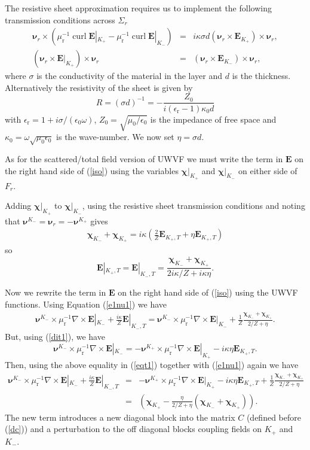 \documentclass[a4paper,12pt]{article}
\newcommand{\bfE}{\mathbf{E}}
\newcommand{\bfnu}{\boldsymbol{\nu}}
\newcommand{\bfchi}{\boldsymbol{\chi}}
\DeclareMathOperator{\curl}{curl}
\newcommand{\epsr}{\epsilon_{\mathrm{r}}}
\newcommand{\mur}{\mu_{\mathrm{r}}}
\begin{document}
The resistive sheet approximation requires us to implement the following transmission conditions across $\Sigma_r$
\begin{eqnarray}
\bfnu_r\times(\mur^{-1}\curl\bfE|_{K_+}-\mur^{-1}\curl\bfE|_{K_-}) &=&i\kappa\sigma d (\bfnu_r\times \bfE_{K_+})\times \bfnu_r,\label{dit1}\\
(\bfnu_r\times \bfE|_{K_+})\times \bfnu_r&=&(\bfnu_r\times \bfE_{K_-})\times \bfnu_r,\label{dit2}
\end{eqnarray}
where $\sigma$ is the conductivity of the material in the layer and $d$ is the thickness.  Alternatively the resistivity of the sheet is given by
\[
R=(\sigma d)^{-1}=-\frac{Z_0}{i(\epsr-1)\kappa_0d}
\]
with $\epsr=1+i\sigma /(\epsilon_0\omega)$, $Z_0=\sqrt{\mu_0/\epsilon_0}$ is the impedance of free space  and $\kappa_0=\omega\sqrt{\mu_0\epsilon_0}$ is the wave-number. We now set  $\eta=\sigma d$. 

As for the scattered/total field version of UWVF we must write the term in $\bfE$ on the right hand side of (\ref{iso})
using the variables $\bfchi|_{K_+}$ and $\bfchi|_{K_-}$ on either side of $F_r$.

Adding $\bfchi|_{K_+}$ to $\bfchi|_{K_-}$, using the resistive sheet transmission conditions and noting that $\bfnu^{K_-}=\bfnu_r=-\bfnu^{K_+}$ gives
\begin{eqnarray*}
\bfchi_{K_-}+\bfchi_{K_+}
=i\kappa\left(\frac{2}{Z}\bfE_{K_+,T} + \eta \bfE_{K_+,T}\right)
\end{eqnarray*}
so
\begin{equation}
\bfE|_{K_+,T}=\bfE|_{K_-,T}=\frac{\bfchi_{K_-}+\bfchi_{K_+}}{2i\kappa/Z+i\kappa\eta }.
\label{e1nu1}
\end{equation}

Now we rewrite the term in $\bfE$ on the right hand side of (\ref{iso}) using the UWVF functions. Using Equation (\ref{e1nu1}) we have
  \begin{eqnarray}
\bfnu^{K_-}\times\mur^{-1}\nabla\times\bfE|_{K_-}+\frac{i\kappa{}}{Z} \bfE|_{K_-,T}=
\bfnu^{K_-}\times\mur^{-1}\nabla\times\bfE|_{K_-}+\frac{1}{Z} \frac{\bfchi_{K_-}+\bfchi_{K_+}}{2/Z+\eta }.
\label{eqt1}
\end{eqnarray}
But, using (\ref{dit1}), we have
\[
\bfnu^{K_-}\times\mur^{-1}\nabla\times\bfE|_{K_-}=-\bfnu^{K_+}\times\mur^{-1}\nabla\times\bfE|_{K_+}-i\kappa\eta\bfE_{K_+,T}.
\]
 Then, using the above equality in (\ref{eqt1}) together with (\ref{e1nu1}) again we have 
\begin{eqnarray*}
\bfnu^{K_-}\times\mur^{-1}\nabla\times\bfE|_{K_-}+\frac{i\kappa{}}{Z} \bfE|_{K_-,T} &=& 
-\bfnu^{K_+}\times\mur^{-1}\nabla\times\bfE|_{K_+}-i\kappa\eta\bfE_{K_+,T}+\frac{1}{Z} \frac{\bfchi_{K_-}+\bfchi_{K_+}}{2/Z+\eta }
\\
&=& 
\left(\bfchi_{K_+}-\frac{\eta}{2/Z+\eta }(\bfchi_{K_-}+\bfchi_{K_+})
\right).
\end{eqnarray*}
The new term introduces a new diagonal block into the matrix $C$ (defined before (\ref{dc})) and a perturbation to
the off diagonal blocks coupling fields on $K_+$ and $K_-$.
\end{document}
